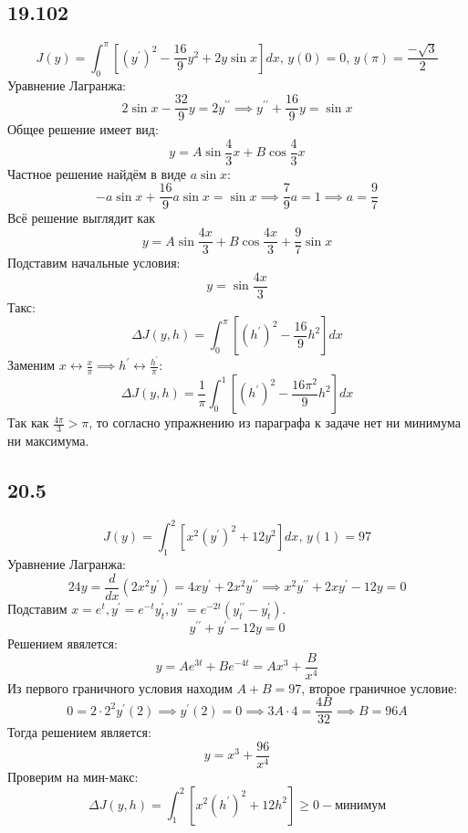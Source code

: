 \documentclass[12pt]{article}
\begin{document}
\subsection*{19.102}
\[
    J(y) = \int_{0}^{\pi} \left[ (y^{\prime})^2 - \frac{16}{9} y^2 + 2y \sin x \right] dx, \, y(0) = 0, \, y(\pi) = \frac{-\sqrt{3} }{2} 
\]
Уравнение Лагранжа: 
\[
    2\sin x - \frac{32}{9} y = 2y^{\prime\prime} \implies 
    y^{\prime\prime} + \frac{16}{9} y = \sin x
\]
Общее решение имеет вид: 
\[
    y = A \sin \frac{4}{3} x + B \cos \frac{4}{3} x
\]
Частное решение найдём в виде $a \sin x$: 
\[
    -a \sin x + \frac{16}{9} a \sin x = \sin x \implies 
    \frac{7}{9} a = 1 \implies a = \frac{9}{7}
\]
Всё решение выглядит как 
\[
    y = A \sin \frac{4x}{3} + B \cos \frac{4x}{3} + \frac{9}{7} \sin x
\]
Подставим начальные условия: 
\[
    y = \sin \frac{4x}{3}
\]
Такс: 
\[
    \Delta J(y, h) = 
    \int_{0}^{\pi} \left[ (h^{\prime})^2 - \frac{16}{9} h^2 \right] dx
\]
Заменим $x \leftrightarrow \frac{x}{\pi} \implies h^{\prime} \leftrightarrow \frac{h^{\prime}}{\pi}$: 
\[
    \Delta J(y, h) = \frac{1}{\pi} \int_{0}^{1} \left[ (h^{\prime})^2 - \frac{16 \pi^2}{9} h^2  \right]  dx
\] 
Так как $\frac{4\pi}{3} > \pi$, то согласно упражнению из параграфа к задаче нет ни минимума ни максимума. 

\subsection*{20.5}
\[
    J(y) = \int_{1}^{2} [x^2 (y^{\prime})^2 + 12y^2] dx, \, y(1) = 97
\]
Уравнение Лагранжа: 
\[
    24y = \frac{d}{dx} (2x^2 y^{\prime}) = 4x y^{\prime} + 2x^2 y^{\prime\prime} \implies 
    x^2 y^{\prime\prime} + 2xy^{\prime} - 12 y = 0
\]
Подставим $x = e^t, y^{\prime} = e^{-t} y^{\prime}_t, y^{\prime\prime} = e^{-2t} (y^{\prime\prime}_t - y^{\prime}_t)$. 
\[
    y^{\prime\prime} + y^{\prime} - 12y = 0
\]
Решением явялется: 
\[
    y = A e^{3t} + B e^{-4t} = Ax^3 + \frac{B}{x^4}
\]
Из первого граничного условия находим $A + B = 97$, второе граничное условие: 
\[
    0 = 2 \cdot 2^2 y^{\prime}(2) \implies y^{\prime}(2) = 0 \implies 
    3 A \cdot 4 = \frac{4B}{32} \implies B = 96 A
\]
Тогда решением является: 
\[
    y = x^3 + \frac{96}{x^4}
\]
Проверим на мин-макс: 
\[
    \Delta J(y, h) = \int_{1}^2 \left[ x^2 (h^{\prime})^2 + 12h^2 \right] \geq 0 - \text{минимум} 
\]
\end{document}
